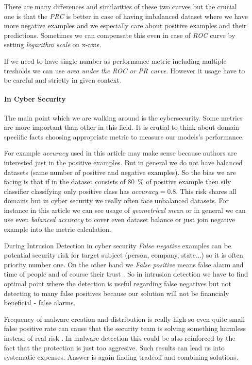 There are many differences and similarities of these two curves but the crucial one is that the \emph{PRC} is better in case of having imbalanced dataset where we have more negative examples and we especially care about positive examples and their predictions. Sometimes we can compensate this even in case of \emph{ROC} curve by setting \emph{logarithm scale} on x-axis.

If we need to have single number as performance metric including multiple tresholds we can use \emph{area under the ROC or PR curve}. However it usage have to be careful and strictly in given context.

\paragraph{In Cyber Security}
The main point which we are walking around is the cybersecurity. Some metrics are more important than other in this field. It is crutial to think about domain speciific facts choosing appropriate metric to measure our models's performance.

For example \emph{accuracy} used in this article \cite{Ghanaei2016} may make sense because authors are interested just in the positive examples. But in general we do not have balanced datasets (same number of positive and negative examples). So the bias we are facing is that if in the dataset consists of 80~\% of positive example then sily classifier classifying only positive class has $accuracy=0.8$. This risk shares all domains but in cyber security we really often face unbalanced datasets. For instance in this article \cite{Hernandez-Callejo2019} we can see usage of \emph{geometrical mean} or in general we can use even \emph{balanced accuracy} to cover even dataset balance or just join negative example into the metric calculation.

During Intrusion Detection in cyber security \emph{False negative} examples can be potential security risk for target subject (person, company, state...) so it is often priority number one. On the other hand we \emph{False positive} means false alarm and time of people and of course their trust \cite{owaspintrusion}. So in intrusion detection we have to find optimal point where the detection is useful regarding false negatives but not detecting to many false positives because our solution will not be financialy beneficial - false alarms.

Frequency of malware creation and distribution is really high so even quite small false positive rate can cause that the security team is solving something harmless instead of real risk \cite{Apruzzese2018}. In malware detection this could be also reinforced by the fact that the protection is just too aggresive. Such results can lead us into systematic expenses. Answer is again finding tradeoff and combining solutions.\cite{Kubovic2017}

